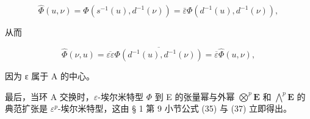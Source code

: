 \[
\hat {\Phi} (u, \nu) = \Phi (s ^ {- 1} (u), d ^ {- 1} (\nu)) = \bar {\varepsilon} \Phi (d ^ {- 1} (u), d ^ {- 1} (\nu)),
\]

从而

\[
\widehat {\Phi} (\nu , u) = \overline {{\varepsilon \varepsilon}} \overline {{\Phi (d ^ {- 1} (u) , d ^ {- 1} (\nu))}} = \overline {{\varepsilon}} \widehat {\Phi} (u, \nu),
\]

因为 ε 属于 A 的中心。

最后，当环 A 交换时，\(\varepsilon\)-埃尔米特型 \(\Phi\) 到 E 的张量幂与外幂 \(\bigotimes^{p}\mathbf{E}\) 和 \(\bigwedge^{p}\mathbf{E}\) 的典范扩张是 \(\varepsilon^{p}\)-埃尔米特型，这由 § 1 第 9 小节公式 (35) 与 (37) 立即得出。

